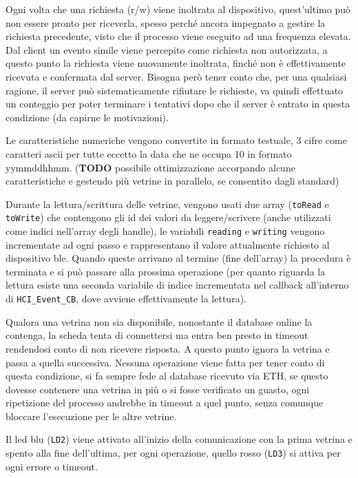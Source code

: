 Ogni volta che una richiesta (r/w) viene inoltrata al dispositivo, quest'ultimo pu\`o non essere pronto per riceverla, spesso perch\'e ancora impegnato a gestire la richiesta precedente, visto che il processo viene eseguito ad una frequenza elevata. Dal client un evento simile viene percepito come richiesta non autorizzata, a questo punto la richiesta viene nuovamente inoltrata, finch\'e non \`e effettivamente ricevuta e confermata dal server. Bisogna per\`o tener conto che, per una qualsiasi ragione, il server pu\`o sistematicamente rifiutare le richieste, va quindi effettuato un conteggio per poter terminare i tentativi dopo che il server \`e entrato in questa condizione (da capirne le motivazioni).

Le caratteristiche numeriche vengono convertite in formato testuale, 3 cifre come caratteri ascii per tutte eccetto la data che ne occupa 10 in formato yymmddhhmm. (\textbf{TODO} possibile ottimizzazione accorpando alcune caratteristiche e gestendo pi\`u vetrine in parallelo, se consentito dagli standard)

Durante la lettura/scrittura delle vetrine, vengono usati due array (\texttt{toRead} e \texttt{toWrite}) che contengono gli id dei valori da leggere/scrivere (anche utilizzati come indici nell'array degli handle), le variabili \texttt{reading} e \texttt{writing} vengono incrementate ad ogni passo e rappresentano il valore attualmente richiesto al dispositivo ble. Quando queste arrivano al termine (fine dell'array) la procedura \`e terminata e si pu\`o passare alla prossima operazione (per quanto riguarda la lettura esiste una seconda variabile di indice incrementata nel callback all'interno di \texttt{HCI\_Event\_CB}, dove avviene effettivamente la lettura).

Qualora una vetrina non sia disponibile, nonostante il database online la contenga, la scheda tenta di connettersi ma entra ben presto in timeout rendendosi conto di non ricevere risposta. A questo punto ignora la vetrina e passa a quella successiva. Nessuna operazione viene fatta per tener conto di questa condizione, si fa sempre fede al database ricevuto via ETH, se questo dovesse contenere una vetrina in pi\`u o si fosse verificato un guasto, ogni ripetizione del processo andrebbe in timeout a quel punto, senza comunque bloccare l'esecuzione per le altre vetrine.

Il led blu (\texttt{LD2}) viene attivato all'inizio della comunicazione con la prima vetrina e spento alla fine dell'ultima, per ogni operazione, quello rosso (\texttt{LD3}) si attiva per ogni errore o timeout.

